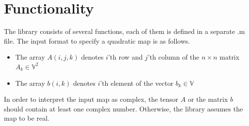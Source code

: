 \documentclass[a4paper]{article}
\theoremstyle{definition}
\begin{document}
\newpage

\section*{Functionality}
The library consists of several functions, each of them is defined in a separate .m file.
The input format to specify a quadratic map is as follows.

\begin{itemize}
\item The array $A(i, j, k)$ denotes $i$'th row and $j$'th column of the $n\times n$ matrix $A_k\in\mathbb{V}^2$
\item The array $b(i, k)$ denotes $i$'th element of the vector $b_k\in\mathbb{V}$
\end{itemize}

In order to interpret the input map as complex, the tensor $A$ or the matrix $b$ should contain at least one complex number. Otherwise, the library assumes the map to be real.
\end{document}
